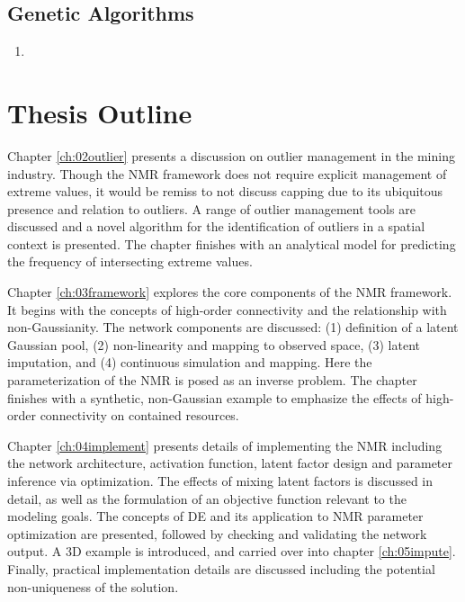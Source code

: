 \FloatBarrier
\subsection{Genetic Algorithms}
\label{subsec:01genetic}

\begin{enumerate}
    \item \cite{price2013differential, georgioudakis2020comparative,bilal2020differential, piotrowski2017review, penunuri2016study, conn2009introduction, rios2013derivativefree}
\end{enumerate}

\FloatBarrier
\section{Thesis Outline}
\label{sec:01outline}

Chapter \ref{ch:02outlier} presents a discussion on outlier management in the mining industry. Though the \gls{NMR} framework does not require explicit management of extreme values, it would be remiss to not discuss capping due to its ubiquitous presence and relation to outliers. A range of outlier management tools are discussed and a novel algorithm for the identification of outliers in a spatial context is presented. The chapter finishes with an analytical model for predicting the frequency of intersecting extreme values.

Chapter \ref{ch:03framework} explores the core components of the \gls{NMR} framework. It begins with the concepts of high-order connectivity and the relationship with non-Gaussianity. The network components are discussed: (1) definition of a latent Gaussian pool, (2) non-linearity and mapping to observed space, (3) latent imputation, and (4) continuous simulation and mapping. Here the parameterization of the \gls{NMR} is posed as an inverse problem. The chapter finishes with a synthetic, non-Gaussian example to emphasize the effects of high-order connectivity on contained resources.

Chapter \ref{ch:04implement} presents details of implementing the \gls{NMR} including the network architecture, activation function, latent factor design and parameter inference via optimization. The effects of mixing latent factors is discussed in detail, as well as the formulation of an objective function relevant to the modeling goals. The concepts of \acrfull{DE} and its application to \gls{NMR} parameter optimization are presented, followed by checking and validating the network output. A \gls{3D} example is introduced, and carried over into chapter \ref{ch:05impute}. Finally, practical implementation details are discussed including the potential non-uniqueness of the solution.

